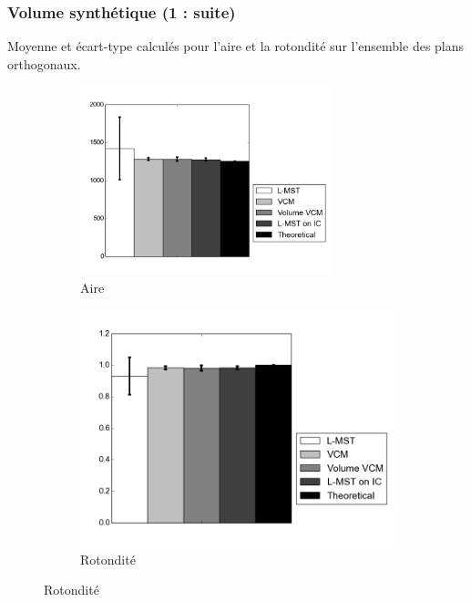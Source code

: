 \documentclass{beamer}
\begin{document}
\begin{frame}
\frametitle{Volume synthétique (1 : suite)}
	Moyenne et écart-type calculés pour l'aire et la rotondité sur l'ensemble des plans orthogonaux.
	\begin{figure}[H]
		\centering
		\begin{subfigure}[t]{0.5\textwidth}
			\centering
			\includegraphics[width=0.8\textwidth, clip, trim = 0 1.5cm 6.6cm 0]{fig/corrected_area.png} %
			\caption{Aire}
			\label{fig:areanoisy}
		\end{subfigure}%
		\begin{subfigure}[t]{0.5\textwidth}
			\centering
			\includegraphics[width=1.2\textwidth, clip, trim = 0 1.5cm 0 0cm]{fig/corrected_round.png}
			\caption{Rotondité}
			\label{fig:roundnessnoisy}
		\end{subfigure}
	\end{figure}		
\end{frame}
\end{document}
